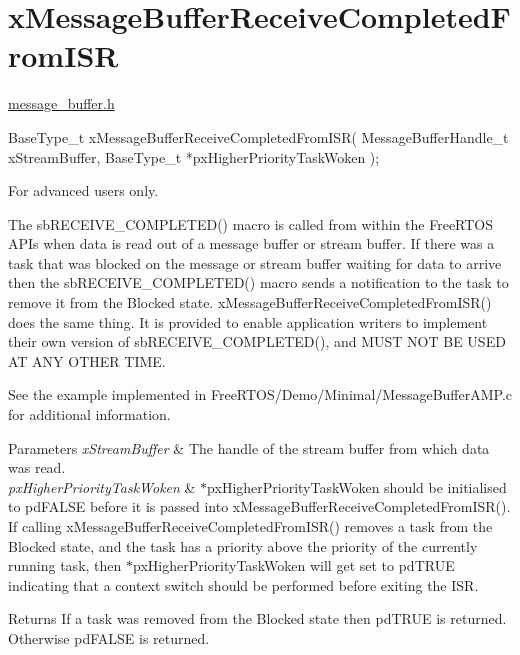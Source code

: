 \hypertarget{group__x_message_buffer_receive_completed_from_i_s_r}{}\section{x\+Message\+Buffer\+Receive\+Completed\+From\+I\+SR}
\label{group__x_message_buffer_receive_completed_from_i_s_r}
\mbox{\hyperlink{message__buffer_8h_source}{message\+\_\+buffer.\+h}}


\begin{DoxyPre}
BaseType\_t xMessageBufferReceiveCompletedFromISR( MessageBufferHandle\_t xStreamBuffer, BaseType\_t *pxHigherPriorityTaskWoken );
\end{DoxyPre}


For advanced users only.

The sb\+R\+E\+C\+E\+I\+V\+E\+\_\+\+C\+O\+M\+P\+L\+E\+T\+E\+D() macro is called from within the Free\+R\+T\+OS A\+P\+Is when data is read out of a message buffer or stream buffer. If there was a task that was blocked on the message or stream buffer waiting for data to arrive then the sb\+R\+E\+C\+E\+I\+V\+E\+\_\+\+C\+O\+M\+P\+L\+E\+T\+E\+D() macro sends a notification to the task to remove it from the Blocked state. x\+Message\+Buffer\+Receive\+Completed\+From\+I\+S\+R() does the same thing. It is provided to enable application writers to implement their own version of sb\+R\+E\+C\+E\+I\+V\+E\+\_\+\+C\+O\+M\+P\+L\+E\+T\+E\+D(), and M\+U\+ST N\+OT BE U\+S\+ED AT A\+NY O\+T\+H\+ER T\+I\+ME.

See the example implemented in Free\+R\+T\+O\+S/\+Demo/\+Minimal/\+Message\+Buffer\+A\+M\+P.\+c for additional information.


\begin{DoxyParams}{Parameters}
{\em x\+Stream\+Buffer} & The handle of the stream buffer from which data was read.\\
\hline
{\em px\+Higher\+Priority\+Task\+Woken} & $\ast$px\+Higher\+Priority\+Task\+Woken should be initialised to pd\+F\+A\+L\+SE before it is passed into x\+Message\+Buffer\+Receive\+Completed\+From\+I\+S\+R(). If calling x\+Message\+Buffer\+Receive\+Completed\+From\+I\+S\+R() removes a task from the Blocked state, and the task has a priority above the priority of the currently running task, then $\ast$px\+Higher\+Priority\+Task\+Woken will get set to pd\+T\+R\+UE indicating that a context switch should be performed before exiting the I\+SR.\\
\hline
\end{DoxyParams}
\begin{DoxyReturn}{Returns}
If a task was removed from the Blocked state then pd\+T\+R\+UE is returned. Otherwise pd\+F\+A\+L\+SE is returned. 
\end{DoxyReturn}
